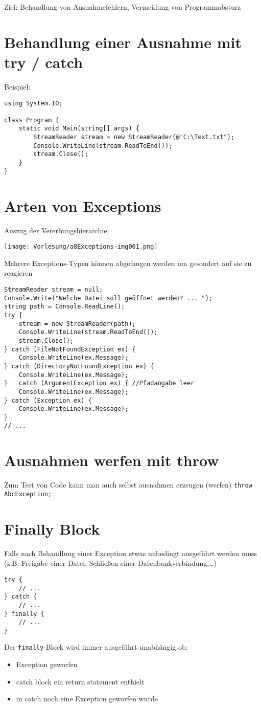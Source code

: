 Ziel: Behandlung von Ausnahmefehlern, Vermeidung von Programmabsturz

\section{Behandlung einer Ausnahme mit try / catch}
Beispiel:
\begin{lstlisting}[language={[Sharp]C}]
using System.IO;

class Program {
	static void Main(string[] args) {
		StreamReader stream = new StreamReader(@"C:\Text.txt");
		Console.WriteLine(stream.ReadToEnd());
		stream.Close();
	}
}
\end{lstlisting}

\section{Arten von Exceptions}
Auszug der Vererbungshierarchie:

\begin{center}
\texttt{[image: Vorlesung/a8Exceptions-img001.png]}
\end{center}
Mehrere Exceptions-Typen können abgefangen werden um gesondert auf sie zu reagieren

\begin{lstlisting}[language={[Sharp]C}]
StreamReader stream = null;
Console.Write("Welche Datei soll geöffnet werden? ... ");
string path = Console.ReadLine();
try {
	stream = new StreamReader(path);
	Console.WriteLine(stream.ReadToEnd());
	stream.Close();
} catch (FileNotFoundException ex) {
	Console.WriteLine(ex.Message);
} catch (DirectoryNotFoundException ex) {
	Console.WriteLine(ex.Message);
}	catch (ArgumentException ex) { //Pfadangabe leer
	Console.WriteLine(ex.Message);
} catch (Exception ex) {
	Console.WriteLine(ex.Message);
}
// ...
\end{lstlisting}

\section{Ausnahmen werfen mit throw}
Zum Test von Code kann man auch selbst ausnahmen erzeugen (werfen)
\lstinline$throw AbcException;$

\section{Finally Block}
Falls nach Behandlung einer Exception etwas unbedingt ausgeführt werden muss (z.B. Freigabe einer Datei, Schließen einer Datenbankverbindung,…)
\begin{lstlisting}[language={[Sharp]C}]
try {
	// ...
} catch {
	// ...
} finally {
	// ...
}
\end{lstlisting}
Der \lstinline$finally$-Block wird immer ausgeführt unabhängig ob:
\begin{itemize}
\item Exception geworfen
\item catch block ein return statement enthielt
\item in catch noch eine Exception geworfen wurde 
\end{itemize}

